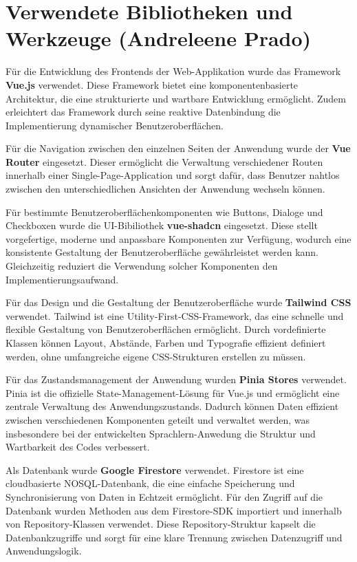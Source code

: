 \section{Verwendete Bibliotheken und Werkzeuge (Andreleene Prado)}
Für die Entwicklung des Frontends der Web-Applikation wurde das Framework \textbf{Vue.js} verwendet.
Diese Framework bietet eine komponentenbasierte Architektur, die eine strukturierte und wartbare Entwicklung ermöglicht.
Zudem erleichtert das Framework durch seine reaktive Datenbindung die Implementierung dynamischer Benutzeroberflächen. \parencite{Vue}

Für die Navigation zwischen den einzelnen Seiten der Anwendung wurde der \textbf{Vue Router} eingesetzt.
Dieser ermöglicht die Verwaltung verschiedener Routen innerhalb einer Single-Page-Application und sorgt dafür, 
dass Benutzer nahtlos zwischen den unterschiedlichen Ansichten der Anwendung wechseln können. \parencite{Vue_Router}

Für bestimmte Benutzeroberflächenkomponenten wie Buttons, Dialoge und Checkboxen wurde die UI-Bibiliothek \textbf{vue-shadcn} eingesetzt.
Diese stellt vorgefertige, moderne und anpassbare Komponenten zur Verfügung, wodurch eine konsistente Gestaltung der Benutzeroberfläche gewährleistet werden kann.
Gleichzeitig reduziert die Verwendung solcher Komponenten den Implementierungsaufwand.

Für das Design und die Gestaltung der Benutzeroberfläche wurde \textbf{Tailwind CSS} verwendet.
Tailwind ist eine Utility-First-CSS-Framework, das eine schnelle und flexible Gestaltung von Benutzeroberflächen ermöglicht.
Durch vordefinierte Klassen können Layout, Abstände, Farben und Typografie effizient definiert werden, ohne umfangreiche eigene CSS-Strukturen erstellen zu müssen. \parencite{TailwindCSS}

Für das Zustandsmanagement der Anwendung wurden \textbf{Pinia Stores} verwendet.
Pinia ist die offizielle State-Management-Lösung für Vue.js und ermöglicht eine zentrale Verwaltung des Anwendungszustands.
Dadurch können Daten effizient zwischen verschiedenen Komponenten geteilt und verwaltet werden, was insbesondere bei der entwickelten Sprachlern-Anwedung die Struktur und Wartbarkeit des Codes verbessert. \parencite{Pinia}

Als Datenbank wurde \textbf{Google Firestore} verwendet.
Firestore ist eine cloudbasierte NOSQL-Datenbank, die eine einfache Speicherung und Synchronisierung von Daten in Echtzeit ermöglicht.
Für den Zugriff auf die Datenbank wurden Methoden aus dem Firestore-SDK importiert und innerhalb von Repository-Klassen verwendet.
Diese Repository-Struktur kapselt die Datenbankzugriffe und sorgt für eine klare Trennung zwischen Datenzugriff und Anwendungslogik.

